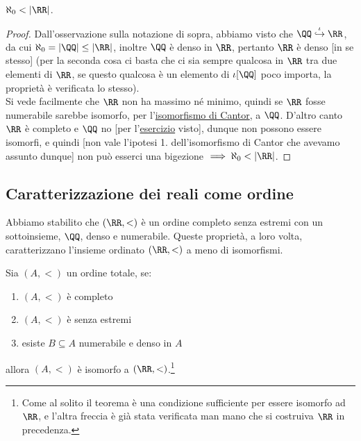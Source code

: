 \documentclass[11pt]{scrartcl}
\begin{document}
\begin{corollary}
	$\aleph_0 < |\RR|$.
\end{corollary}

\begin{proof}
	Dall'osservazione sulla notazione di sopra, abbiamo visto che $\QQ \overset{\iota}{\hookrightarrow} \RR$, da cui $\aleph_0 = |\QQ| \leq |\RR|$, inoltre $\QQ$ è denso in $\RR$, pertanto 
	$\RR$ è denso [in se stesso] (per la seconda cosa ci basta che ci sia sempre qualcosa in $\RR$ tra due elementi di $\RR$, se questo qualcosa è un elemento di $\iota[\QQ]$ poco importa,
	la proprietà è verificata lo stesso).\\ Si vede facilmente che $\RR$ non ha massimo né minimo, quindi se $\RR$ fosse numerabile sarebbe isomorfo, per l'\hyperref[isoCantor]{isomorfismo di Cantor},
	a $\QQ$. D'altro canto $\RR$ è completo e $\QQ$ no [per l'\hyperref[q_noncompleto]{esercizio} visto], dunque non possono essere isomorfi, e quindi [non vale l'ipotesi 1. dell'isomorfismo di Cantor che avevamo assunto dunque] non può esserci una bigezione $\implies \aleph_0 < |\RR|$.
\end{proof}

\subsection{Caratterizzazione dei reali come ordine}
Abbiamo stabilito che $(\RR,<)$ è un ordine completo senza estremi con un sottoinsieme, $\QQ$, denso e numerabile.
Queste proprietà, a loro volta, caratterizzano l'insieme ordinato $(\RR,<)$ a meno di isomorfismi.

\begin{proposition}[Caratterizzazione di $(\RR,<)$]
	Sia $(A,<)$ un ordine totale, se:
	\begin{enumerate}[1.]
		\item $(A,<)$ è completo
		\item $(A,<)$ è senza estremi
		\item esiste $B \subseteq A$ numerabile e denso in $A$
	\end{enumerate} 
	allora $(A,<)$ è isomorfo a $(\RR,<)$.\footnote{Come al solito il teorema è una
	condizione sufficiente per essere isomorfo ad $\RR$, e l'altra freccia è già stata verificata man mano che si costruiva $\RR$ in precedenza.}
\end{proposition}
\end{document}
